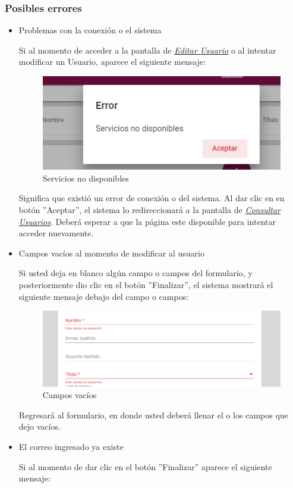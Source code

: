   \subsubsection{Posibles errores}
  \begin{itemize}
  	\item Problemas con la conexión o el sistema

  	Si al momento de acceder a la pantalla de \hyperlink{editarUs}{\textit{Editar Usuario}} o al intentar modificar un Usuario, aparece el siguiente mensaje:
  	\clearpage
  	\begin{figure}[H]
  		\centering
  		\includegraphics[width=0.4\linewidth]{images/SP5/MSGSN}
  		\caption{Servicios no disponibles}

  	\end{figure}


  	Significa que existió un error de conexión o del sistema. Al dar clic en en botón ''Aceptar'', el sistema lo redireccionará  a la pantalla de \hyperlink{consultarUs}{\textit{Consultar Usuarios}}. Deberá esperar a que la página este disponible para intentar acceder nuevamente.

  	\item Campos vacíos al momento de modificar al usuario

  	Si usted deja en blanco algún campo o campos del formulario, y posteriormente dio clic en el botón ''Finalizar'', el sistema mostrará el siguiente mensaje debajo del campo o campos:

  	\begin{figure}[H]
  		\centering
  		\includegraphics[width=0.4\linewidth]{images/SP5/MSG44}
  		\caption{Campos vacíos}
  		\label{mensaje44}

  	\end{figure}

  	Regresará  al formulario, en donde usted deberá llenar el o los campos que dejo vacíos.
  	\item El correo ingresado ya existe

  	Si al momento de dar clic en el botón ''Finalizar'' aparece el siguiente mensaje:


\end{itemize}
